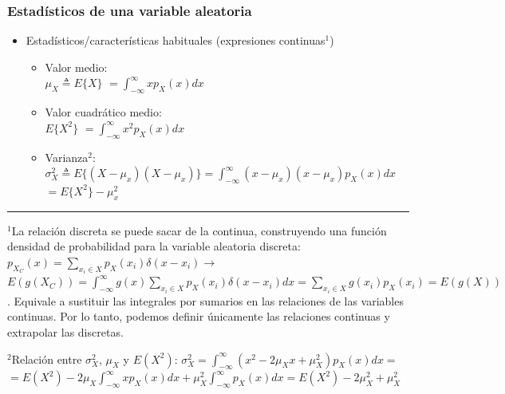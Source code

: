 \documentclass{beamer}
\numberwithin{section}{part}
\begin{document}
\begin{frame}\frametitle{Estadísticos de una variable aleatoria}
  \footnotesize

  \begin{itemize}
    \item Estadísticos/características habituales (expresiones continuas$^1$)

    \begin{itemize}\footnotesize
      \item \alert{Valor medio}:\\\vspace{0.1cm}$\mu_X \triangleq E\{X\}$ $=\int_{-\infty}^{\infty}x p_X(x)dx$
      \item \alert{Valor cuadrático medio:}\\\vspace{0.1cm}$E\{X^2\}$ $=\int_{-\infty}^{\infty}x^2 p_X(x)dx$
      \item \alert{Varianza$^2$:}\\\vspace{0.1cm}$\sigma^2_X \triangleq E\{(X-\mu_x)(X-\mu_x)\}=\int_{-\infty}^{\infty}(x-\mu_x)(x-\mu_x) p_X(x)dx$ $=E\{X^2\}-\mu_x^2$
    \end{itemize}

  \end{itemize}

  \rule{11cm}{0.04ex}
  \scriptsize
  $^1$La relación discreta se puede sacar de la continua, construyendo una función densidad de probabilidad para la variable aleatoria discreta:  $p_{X_C}(x)=\sum_{x_i \in X} p_X(x_i)\delta(x-x_i) \rightarrow$
  $E(g(X_C))\!=\!\int_{-\infty}^{\infty}\!g(x)\! \sum_{x_i \in X} p_X(x_i)\delta(x\!-\!x_i)dx\!=\!\sum_{x_i \in X} g(x_i)p_X(x_i)=E(g(X))$. Equivale a sustituir las integrales por sumarios en las relaciones de las variables continuas. Por lo tanto, podemos definir únicamente las relaciones continuas y extrapolar las discretas.

  \vspace{0.2cm}

  $^2$Relación entre $\sigma^2_X$, $\mu_X$ y $E(X^2)$:  $\sigma^2_X\!=\!\! \int_{-\infty}^{\infty}\!\!(x^2\!-\!2 \mu_X x\!+\! \mu_X^2) p_X(x)dx=$ $=E(X^2)-2\mu_X \int_{-\infty}^{\infty}x p_X(x)dx+ \mu_X^2  \int_{-\infty}^{\infty}p_X(x)dx=E(X^2)-2\mu_X^2+\mu_X^2 $

\end{frame}

\end{document}
